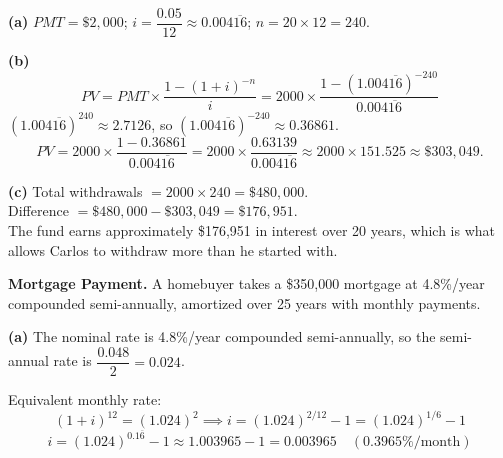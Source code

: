 \documentclass[addpoints]{exam}
\begin{document}
\begin{questions}
\begin{solution}
\textbf{(a)} $PMT = \$2{,}000$; \quad $i = \dfrac{0.05}{12} \approx 0.004\overline{16}$; \quad $n = 20 \times 12 = 240$.

\textbf{(b)}
\[
PV = PMT \times \frac{1-(1+i)^{-n}}{i}
   = 2000 \times \frac{1-(1.004\overline{16})^{-240}}{0.004\overline{16}}
\]
$(1.004\overline{16})^{240} \approx 2.7126$, so $(1.004\overline{16})^{-240} \approx 0.36861$.
\[
PV = 2000 \times \frac{1 - 0.36861}{0.004\overline{16}}
   = 2000 \times \frac{0.63139}{0.004\overline{16}}
   \approx 2000 \times 151.525
   \approx \$303{,}049.
\]

\textbf{(c)}
Total withdrawals $= 2000 \times 240 = \$480{,}000$.\\
Difference $= \$480{,}000 - \$303{,}049 = \$176{,}951$.\\
The fund earns approximately \$176{,}951 in interest over 20 years, which is what allows Carlos to withdraw more than he started with.
\end{solution}

\vspace{5mm}

\question[5]
\textbf{Mortgage Payment.}
A homebuyer takes a \$350{,}000 mortgage at 4.8\%/year compounded semi-annually, amortized over 25 years with monthly payments.


\begin{solution}
\textbf{(a)} The nominal rate is 4.8\%/year compounded semi-annually, so the semi-annual rate is $\dfrac{0.048}{2} = 0.024$.

Equivalent monthly rate:
\[
(1+i)^{12} = (1.024)^{2} \implies i = (1.024)^{2/12} - 1 = (1.024)^{1/6} - 1
\]
\[
i = (1.024)^{0.1\overline{6}} - 1 \approx 1.003965 - 1 = 0.003965 \quad (0.3965\%/\text{month})
\]


\end{solution}
\end{questions}
\end{document}
